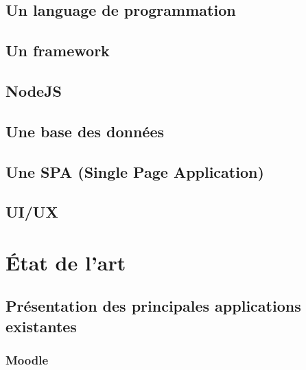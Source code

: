 \documentclass[12pt, a4paper]{report}
\begin{document}
    \section{Un language de programmation}\label{sec:language-de-programmation}
    

    \section{Un framework}\label{sec:framework}
    

    \section{NodeJS}\label{sec:nodejs}
    

    \section{Une base des données}\label{sec:base-de-donnees}
    

    \section{Une SPA (Single Page Application)}\label{sec:spa}
    
    
    \section{UI/UX}\label{sec:ui-ux}
    
    

    \chapter{État de l'art}\label{cha:etat-de-l-art}
    

    \section{Présentation des principales applications existantes}\label{sec:definitions-et-concepts-cles}
    

    \subsection{Moodle}\label{subsec:moodle}
    
\end{document}
